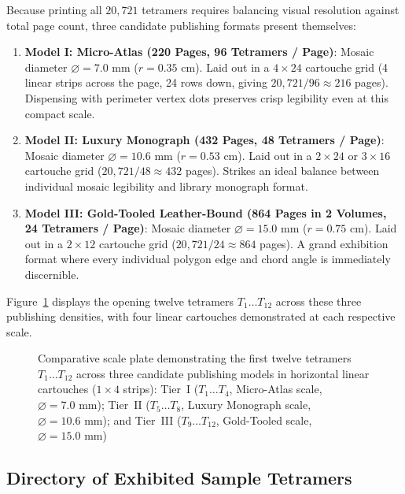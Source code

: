 Because printing all $20{,}721$ tetramers requires balancing visual resolution against total page count, three candidate publishing formats present themselves:
\begin{enumerate}
    \item \textbf{Model I: Micro-Atlas (220 Pages, 96 Tetramers / Page)}:
    Mosaic diameter $\varnothing = 7.0\text{ mm}$ ($r = 0.35\text{ cm}$). Laid out in a $4 \times 24$ cartouche grid (4 linear strips across the page, 24 rows down, giving $20{,}721 / 96 \approx 216$ pages). Dispensing with perimeter vertex dots preserves crisp legibility even at this compact scale.
    
    \item \textbf{Model II: Luxury Monograph (432 Pages, 48 Tetramers / Page)}:
    Mosaic diameter $\varnothing = 10.6\text{ mm}$ ($r = 0.53\text{ cm}$). Laid out in a $2 \times 24$ or $3 \times 16$ cartouche grid ($20{,}721 / 48 \approx 432$ pages). Strikes an ideal balance between individual mosaic legibility and library monograph format.
    
    \item \textbf{Model III: Gold-Tooled Leather-Bound (864 Pages in 2 Volumes, 24 Tetramers / Page)}:
    Mosaic diameter $\varnothing = 15.0\text{ mm}$ ($r = 0.75\text{ cm}$). Laid out in a $2 \times 12$ cartouche grid ($20{,}721 / 24 \approx 864$ pages). A grand exhibition format where every individual polygon edge and chord angle is immediately discernible.
\end{enumerate}

Figure~\ref{fig:tetramer-scale-comparison} displays the opening twelve tetramers $T_1 \dots T_{12}$ across these three publishing densities, with four linear cartouches demonstrated at each respective scale.

\begin{figure}[p]
\centering

\caption{\label{fig:tetramer-scale-comparison}Comparative scale plate demonstrating the first twelve tetramers $T_1 \dots T_{12}$ across three candidate publishing models in horizontal linear cartouches ($1 \times 4$ strips): Tier~I ($T_1 \dots T_4$, Micro-Atlas scale, $\varnothing = 7.0\text{ mm}$); Tier~II ($T_5 \dots T_8$, Luxury Monograph scale, $\varnothing = 10.6\text{ mm}$); and Tier~III ($T_9 \dots T_{12}$, Gold-Tooled scale, $\varnothing = 15.0\text{ mm}$)}
\end{figure}
\clearpage

\subsection{Directory of Exhibited Sample Tetramers}

